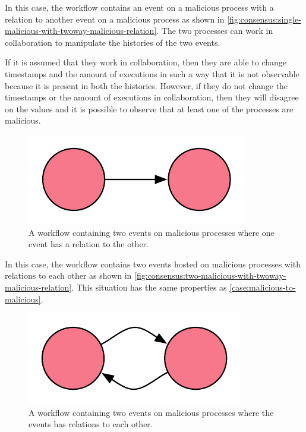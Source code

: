 	\begin{case}
		In this case, the workflow contains an event on a malicious process with a relation to another event on a malicious process as shown in \autoref{fig:consensus:single-malicious-with-twoway-malicious-relation}. The two processes can work in collaboration to manipulate the histories of the two events. 
		
		If it is assumed that they work in collaboration, then they are able to change timestamps and the amount of executions in such a way that it is not observable because it is present in both the histories. However, if they do not change the timestamps or the amount of executions in collaboration, then they will disagree on the values and it is possible to observe that at least one of the processes are malicious.
		\label{case:malicious-to-malicious}
	\end{case}
	
	\begin{figure}[H]
		\centering
		\includegraphics{6validation/images/4.pdf}
		\caption{A workflow containing two events on malicious processes where one event has a relation to the other.}
		\label{fig:consensus:single-malicious-with-twoway-malicious-relation}
	\end{figure}
	
	\begin{case}
		In this case, the workflow contains two events hosted on malicious processes with relations to each other as shown in \autoref{fig:consensus:two-malicious-with-twoway-malicious-relation}. This situation has the same properties as \autoref{case:malicious-to-malicious}.
		\label{case:malicious-to-from-malicious}
	\end{case}

	\begin{figure}[H]
		\centering
		\includegraphics{6validation/images/7.pdf}
		\caption{A workflow containing two events on malicious processes where the events has relations to each other.}
		\label{fig:consensus:two-malicious-with-twoway-malicious-relation}
	\end{figure}
	

